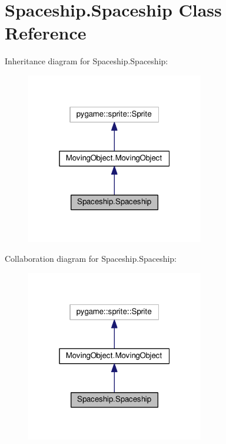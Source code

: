\hypertarget{classSpaceship_1_1Spaceship}{}\section{Spaceship.\+Spaceship Class Reference}
\label{classSpaceship_1_1Spaceship}


Inheritance diagram for Spaceship.\+Spaceship\+:
\nopagebreak
\begin{figure}[H]
\begin{center}
\leavevmode
\includegraphics[width=220pt]{classSpaceship_1_1Spaceship__inherit__graph}
\end{center}
\end{figure}


Collaboration diagram for Spaceship.\+Spaceship\+:
\nopagebreak
\begin{figure}[H]
\begin{center}
\leavevmode
\includegraphics[width=220pt]{classSpaceship_1_1Spaceship__coll__graph}
\end{center}
\end{figure}
